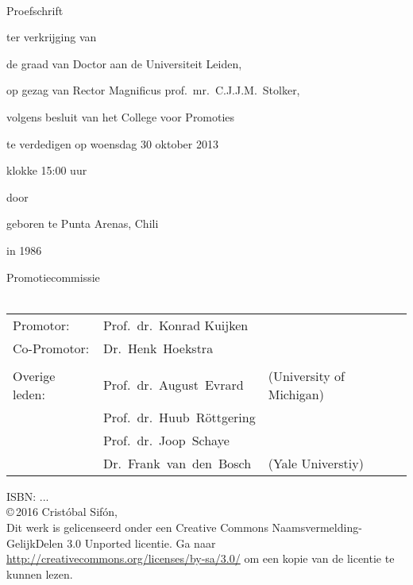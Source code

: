 \pagestyle{empty}

\begin{centering}
\headingfont
  {\huge\bfseries\headingfont\thetitle}\\
  \vspace{6em}

  {\Large\headingfont Proefschrift}
\vspace{4em}

ter verkrijging van

de graad van Doctor aan de Universiteit Leiden,

op gezag van Rector Magnificus prof.~mr.~C.J.J.M.~Stolker, 

volgens besluit van het College voor Promoties

te verdedigen op woensdag 30 oktober 2013 

klokke 15:00 uur
\vspace{4em}

door
\vspace{4em}

{\Large \theauthor}

geboren te Punta Arenas, Chili

in 1986

\end{centering}
\newpage
\small
\noindent
  Promotiecommissie\\
  \vspace{2em}\\
\begin{tabular}{@{}l l l@{}}
  Promotor:      & Prof.~dr.~Konrad Kuijken \\
  Co-Promotor:   & Dr.~Henk~Hoekstra \\
  \vspace{2em}\\
  Overige leden:
                 & Prof.~dr.~August~Evrard     & (University of Michigan) \\
                 & Prof.~dr.~Huub~R\"ottgering \\
                 & Prof.~dr.~Joop~Schaye \\
                 & Dr.~Frank~van~den~Bosch     & (Yale Universtiy) \\
\end{tabular}

\vfill

\noindent ISBN: ...\\
\copyright\,2016 Crist\'obal Sif\'on, \\%
Dit werk is gelicenseerd onder een Creative Commons
Naamsvermelding-GelijkDelen 3.0 Unported licentie.  Ga naar
\url{http://creativecommons.org/licenses/by-sa/3.0/} om een
kopie van de licentie te kunnen lezen. 

